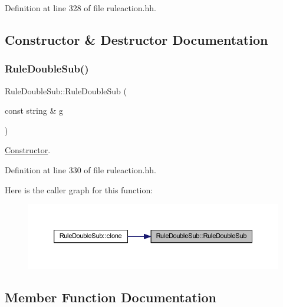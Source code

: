 Definition at line 328 of file ruleaction.\+hh.



\subsection{Constructor \& Destructor Documentation}
\mbox{\label{class_rule_double_sub_aeaa139cc2bc89403b05b2e84614fe983}} 
\subsubsection{\texorpdfstring{RuleDoubleSub()}{RuleDoubleSub()}}
{\footnotesize\ttfamily Rule\+Double\+Sub\+::\+Rule\+Double\+Sub (\begin{DoxyParamCaption}\item[{const string \&}]{g }\end{DoxyParamCaption})\hspace{0.3cm}{\ttfamily [inline]}}



\mbox{\hyperlink{class_constructor}{Constructor}}. 



Definition at line 330 of file ruleaction.\+hh.

Here is the caller graph for this function\+:
\nopagebreak
\begin{figure}[H]
\begin{center}
\leavevmode
\includegraphics[width=350pt]{class_rule_double_sub_aeaa139cc2bc89403b05b2e84614fe983_icgraph}
\end{center}
\end{figure}


\subsection{Member Function Documentation}
\mbox{\label{class_rule_double_sub_a5dac7faa4ee8464a136b3bec0e2057ab}} 
